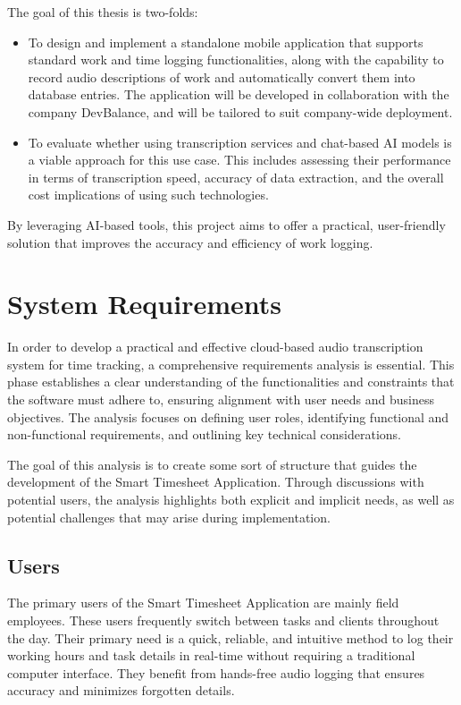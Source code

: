 \documentclass[
  digital,     %
  oneside,     %
  nosansbold,  %
  nocolorbold, %
  lof,         %
  lot,         %
]{fithesis4}
\begin{document}
The goal of this thesis is two-folds:
\begin{itemize}
    \item To design and implement a standalone mobile application that supports standard work and time logging functionalities, along with the capability to record audio descriptions of work and automatically convert them into database entries. The application will be developed in collaboration with the company DevBalance, and will be tailored to suit company-wide deployment.
    \item To evaluate whether using transcription services and chat-based AI models is a viable approach for this use case. This includes assessing their performance in terms of transcription speed, accuracy of data extraction, and the overall cost implications of using such technologies.
\end{itemize}

By leveraging AI-based tools, this project aims to offer a practical, user-friendly solution that improves the accuracy and efficiency of work logging.

\chapter{System Requirements}

In order to develop a practical and effective cloud-based audio transcription system for time tracking, a comprehensive requirements analysis is essential. This phase establishes a clear understanding of the functionalities and constraints that the software must adhere to, ensuring alignment with user needs and business objectives. The analysis focuses on defining user roles, identifying functional and non-functional requirements, and outlining key technical considerations.

The goal of this analysis is to create some sort of structure that guides the development of the Smart Timesheet Application. Through discussions with potential users, the analysis highlights both explicit and implicit needs, as well as potential challenges that may arise during implementation.

\section{Users}

The primary users of the Smart Timesheet Application are mainly field employees. These users frequently switch between tasks and clients throughout the day. Their primary need is a quick, reliable, and intuitive method to log their working hours and task details in real-time without requiring a traditional computer interface. They benefit from hands-free audio logging that ensures accuracy and minimizes forgotten details.
\end{document}

